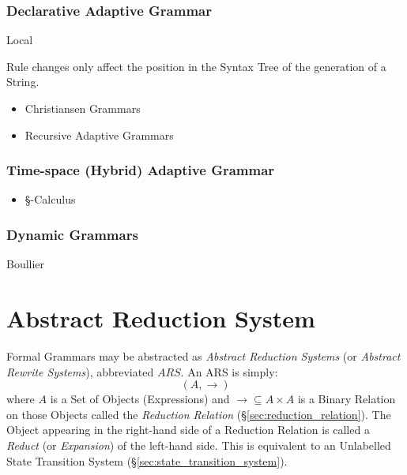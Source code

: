 \subsubsection{Declarative Adaptive Grammar}
\label{sec:declarative_adaptive}

Local

Rule changes only affect the position in the Syntax Tree of the
generation of a String.

\begin{itemize}
  \item Christiansen Grammars
  \item Recursive Adaptive Grammars
\end{itemize}



\subsubsection{Time-space (Hybrid) Adaptive Grammar}
\label{sec:timespace_adaptive}

\begin{itemize}
  \item \S-Calculus
\end{itemize}



\subsubsection{Dynamic Grammars}\label{sec:dynamic_grammar}

Boullier\cite{boullier94}



\section{Abstract Reduction System}\label{sec:abstract_rewrite}

Formal Grammars may be abstracted as \emph{Abstract Reduction Systems}
(or \emph{Abstract Rewrite Systems}), abbreviated $ARS$. An ARS is
simply:
\[
  (A,\rightarrow)
\]
where $A$ is a Set of Objects (Expressions) and $\rightarrow \subseteq
A \times A$ is a Binary Relation on those Objects called the
\emph{Reduction Relation} (\S\ref{sec:reduction_relation}). The Object
appearing in the right-hand side of a Reduction Relation is called a
\emph{Reduct} (or \emph{Expansion}) of the left-hand side. This is
equivalent to an Unlabelled State Transition System
(\S\ref{sec:state_transition_system}).

